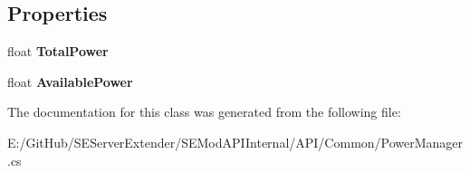 \subsection*{Properties}
\begin{DoxyCompactItemize}
\item 
\hypertarget{class_s_e_mod_a_p_i_internal_1_1_a_p_i_1_1_common_1_1_power_manager_a59ed1f347121358e3fa4922c4376ca2a}{}float {\bfseries Total\+Power}\label{class_s_e_mod_a_p_i_internal_1_1_a_p_i_1_1_common_1_1_power_manager_a59ed1f347121358e3fa4922c4376ca2a}

\item 
\hypertarget{class_s_e_mod_a_p_i_internal_1_1_a_p_i_1_1_common_1_1_power_manager_a18db5c407dc800760ceb246c64f9aaef}{}float {\bfseries Available\+Power}\label{class_s_e_mod_a_p_i_internal_1_1_a_p_i_1_1_common_1_1_power_manager_a18db5c407dc800760ceb246c64f9aaef}

\end{DoxyCompactItemize}


The documentation for this class was generated from the following file\+:\begin{DoxyCompactItemize}
\item 
E\+:/\+Git\+Hub/\+S\+E\+Server\+Extender/\+S\+E\+Mod\+A\+P\+I\+Internal/\+A\+P\+I/\+Common/Power\+Manager.\+cs\end{DoxyCompactItemize}

